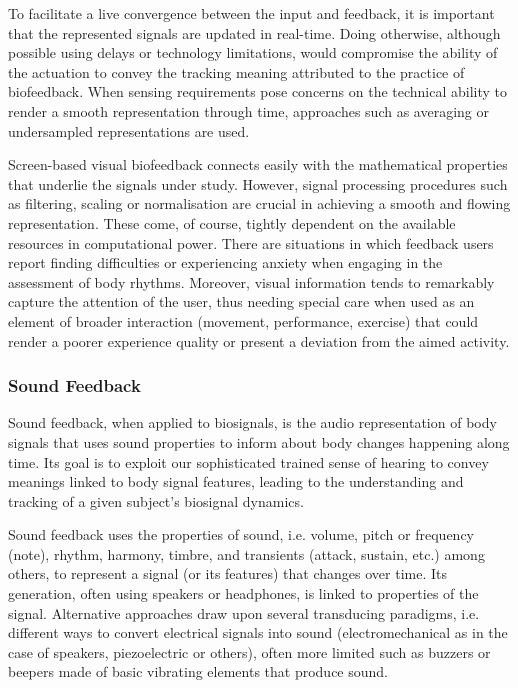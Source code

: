 To facilitate a live convergence between the input and feedback, it is important that the represented signals are updated in real-time. Doing otherwise, although possible using delays or technology limitations, would compromise the ability of the actuation to convey the tracking meaning attributed to the practice of biofeedback. When sensing requirements pose concerns on the technical ability to render a smooth representation through time, approaches such as averaging or undersampled representations are used. 

Screen-based visual biofeedback connects easily with the mathematical properties that underlie the signals under study. However, signal processing procedures such as filtering, scaling or normalisation are crucial in achieving a smooth and flowing representation. These come, of course, tightly dependent on the available resources in computational power.
There are situations in which feedback users report finding difficulties or experiencing anxiety when engaging in the assessment of body rhythms. Moreover, visual information tends to remarkably capture the attention of the user, thus needing special care when used as an element of broader interaction (movement, performance, exercise) that could render a poorer experience quality or present a deviation from the aimed activity.

\subsubsection{Sound Feedback}

Sound feedback, when applied to biosignals, is the audio representation of body signals that uses sound properties to inform about body changes happening along time. Its goal is to exploit our sophisticated trained sense of hearing to convey meanings linked to body signal features, leading to the understanding and tracking of a given subject’s biosignal dynamics.

Sound feedback uses the properties of sound, i.e. volume, pitch or frequency (note), rhythm, harmony, timbre, and transients (attack, sustain, etc.) among others, to represent a signal (or its features) that changes over time. Its generation, often using speakers or headphones, is linked to properties of the signal. Alternative approaches draw upon several transducing paradigms, i.e. different ways to convert electrical signals into sound (electromechanical as in the case of speakers, piezoelectric or others), often more limited such as buzzers or beepers made of basic vibrating elements that produce sound. 

